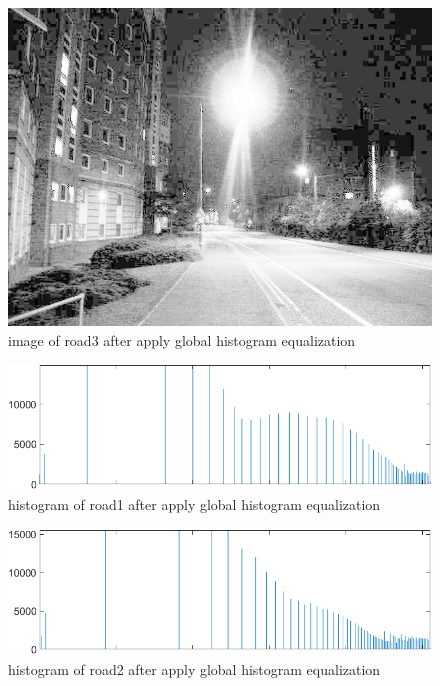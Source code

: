 \documentclass[
	12pt, %
]{fphw}
\begin{document}
\begin{figure}[H]
 
	\centering
	\includegraphics[width=1\columnwidth]{T2/result/I3_myglobal.jpg} 
	\caption{image of road3 after apply global histogram equalization}
	\label{fig12}
\end{figure}
\begin{figure}[H]
 
	\centering
	\includegraphics[width=1\columnwidth]{T2/result/hist1_myglobal.png} 
	\caption{histogram of road1 after apply global histogram equalization}
	\label{fig13}
\end{figure}
\begin{figure}[H]
 
	\centering
	\includegraphics[width=1\columnwidth]{T2/result/hist2_myglobal.png} 
	\caption{histogram of road2 after apply global histogram equalization}
	\label{fig14}
\end{figure}
\end{document}

